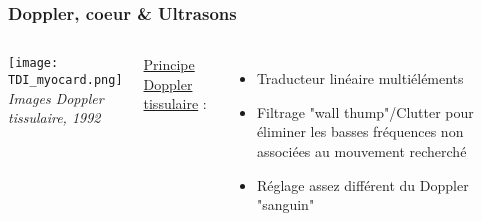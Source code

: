 \documentclass{beamer}
\begin{document}
%
%
%
%

\begin{frame}
\frametitle{Doppler, coeur \& Ultrasons}
\begin{columns}
\column{60mm}
\begin{center}
\texttt{[image: TDI\_myocard.png]}\\
\textit{\footnotesize Images Doppler tissulaire, 1992}
\end{center}
\column{60mm}
\underline{Principe Doppler tissulaire} :
\vspace{0.3cm}
\begin{itemize}
\item Traducteur linéaire multiéléments
\vspace{0.3cm}
\item Filtrage "wall thump"/Clutter pour éliminer les basses fréquences non associées au mouvement recherché 
\vspace{0.3cm}
\item Réglage assez différent du Doppler "sanguin"
\end{itemize}

\end{columns}
\end{frame}
\end{document}
